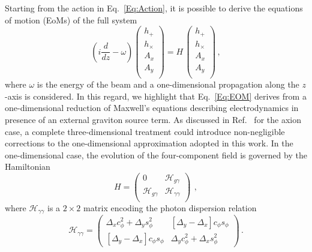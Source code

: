 \documentclass[twocolumn,superscriptaddress,floatfix,preprintnumbers, nofootinbib,hyperref]{revtex4-2}
\begin{document}
Starting from the action in Eq.~\eqref{Eq:Action}, it is possible to derive the equations of motion (EoMs) of the full system~\cite{Gertsenshtein:1962kfm, Raffelt:1987im,Ejlli:2018hke}
\begin{equation}
    \left(i\frac{d}{dz}-\omega\right)\begin{pmatrix}
        h_+\\
        h_\times\\
        A_x\\
        A_y\\
    \end{pmatrix}
    =
    H\,\begin{pmatrix}
        h_+\\
        h_\times\\
        A_x\\
        A_y\\
    \end{pmatrix}\,,
\label{Eq:EOM}
\end{equation}
where $\omega$ is the energy of the beam and a one-dimensional propagation along the $z$-axis is considered. In this regard, we highlight that Eq.~\ref{Eq:EOM} derives from a one-dimensional reduction of Maxwell's equations describing electrodynamics in presence of an external graviton source term. As discussed in Ref.~\cite{Leroy:2019ghm,Millar:2021gzs,McDonald:2024uuh} for the axion case, a complete three-dimensional treatment could introduce non-negligible corrections to the one-dimensional approximation adopted in this work. In the one-dimensional case, the evolution of the four-component field is governed by the Hamiltonian
\begin{equation}
    H=\begin{pmatrix}
        0   &\mathcal{H}_{g\gamma}\\
        \mathcal{H}_{g\gamma} &\mathcal{H}_{\gamma\gamma}\\
    \end{pmatrix} \,\ ,
\end{equation}
where $\mathcal{H}_{\gamma\gamma}$ is a $2\times2$ matrix encoding the photon dispersion relation
\begin{equation}
    \mathcal{H}_{\gamma\gamma}=\begin{pmatrix}
        \Delta_{x}c_\phi^2+\Delta_{y}s_\phi^2   &[\Delta_{y}-\Delta_{x}]c_\phi s_\phi\\
        [\Delta_{y}-\Delta_{x}]c_\phi s_\phi    &\Delta_{y}c_\phi^2+\Delta_{x}s_\phi^2
    \end{pmatrix}\,.
\end{equation}
\end{document}
